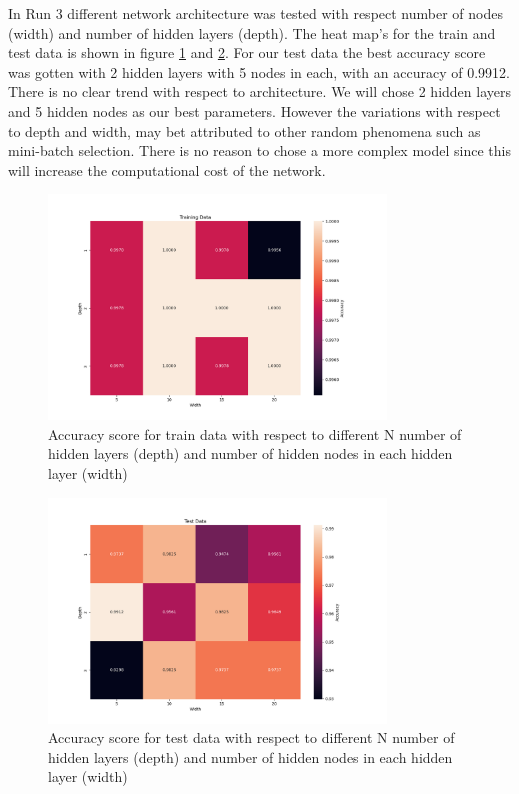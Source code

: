 

In Run 3 different network architecture was tested with respect number of nodes
(width) and number of hidden layers (depth). The heat map's for the train and test
data is shown in figure \ref{fig:d_heatmap_train_depth_vs_width_lambd_0} and
\ref{fig:_d_heatmap_test_depth_vs_width_lambd_0}. For our test data the best
accuracy score was gotten with 2 hidden layers with 5 nodes in each, with an
accuracy of 0.9912. There is no clear trend with respect to architecture. We
will chose 2 hidden layers and 5 hidden nodes as our best parameters. However
the variations with respect to depth and width, may bet attributed to other random
phenomena such as mini-batch selection. There is no reason to chose a more
complex model since this will increase the computational cost of the network.      



\begin{figure}[H]
    \centering
    \includegraphics[width=0.8\textwidth]{Figures/PartD/d_heatmap_train_depth_vs_width_lambd_0.png}
    \caption{Accuracy score for train data with respect to different N number
        of hidden layers (depth) and number of hidden nodes in each hidden layer
    (width)  }  
    \label{fig:d_heatmap_train_depth_vs_width_lambd_0} 
\end{figure}


\begin{figure}[H]
    \centering
    \includegraphics[width=0.8\textwidth]{Figures/PartD/_d_heatmap_test_depth_vs_width_lambd_0.png}
    \caption{Accuracy score for test data with respect to different N number
        of hidden layers (depth) and number of hidden nodes in each hidden layer
    (width)  }  
    \label{fig:_d_heatmap_test_depth_vs_width_lambd_0} 
\end{figure}


